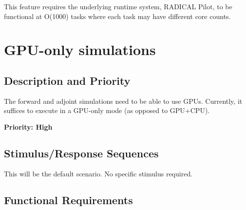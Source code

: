 \documentclass{scrreprt}
\begin{document}

This feature requires the underlying runtime system, RADICAL Pilot, to be functional at O(1000) tasks where each task may have different core counts.

\section{GPU-only simulations}

\subsection{Description and Priority}

The forward and adjoint simulations need to be able to use GPUs. Currently, it suffices to execute in a GPU-only mode (as opposed to GPU+CPU).

\textbf{Priority: High}

\subsection{Stimulus/Response Sequences}

This will be the default scenario. No specific stimulus required.

\subsection{Functional Requirements}
\end{document}
